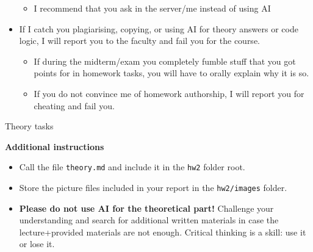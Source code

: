 \documentclass{homework}
\begin{document}
\begin{itemize}
\begin{itemize}
    \item I recommend that you ask in the server/me instead of using AI
  \end{itemize}
  \item If I catch you plagiarising, copying, or using AI for theory answers or code logic, I will report you to the faculty and fail you for the course.
  \begin{itemize}
    \item If during the midterm/exam you completely fumble stuff that you got points for in homework tasks, you will have to orally explain why it is so.
    \item If you do not convince me of homework authorship, I will report you for cheating and fail you.
  \end{itemize}
\end{itemize}

\newpage

\begin{center}
  Theory tasks
\end{center}

\textbf{Additional instructions}

\begin{itemize}
  \item Call the file \texttt{theory.md} and include it in the \texttt{hw2} folder root.
  \item Store the picture files included in your report in the \texttt{hw2/images} folder.
  \item \textbf{Please do not use AI for the theoretical part!}
  Challenge your understanding and search for additional written materials in case the lecture+provided materials are not enough.
  Critical thinking is a skill: use it or lose it.
\end{itemize}
\end{document}
